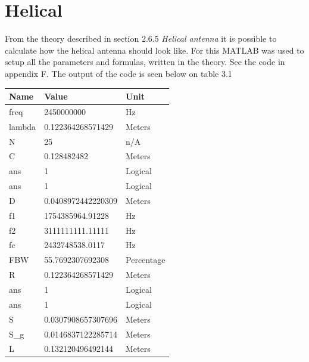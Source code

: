 \newpage

\section{Helical}
From the theory described in section 2.6.5 \textit{Helical antenna} it is possible to calculate how the helical antenna should look like. For this MATLAB\cite{MatLab} was used to setup all the parameters and formulas, written in the theory. See the code in appendix F. The output of the code is seen below on table 3.1

\begin{table}[h!]
\centering
\begin{tabular}{|l|l|l|}
\hline
Name      & Value              & Unit                   \\ \hline
freq      & 2450000000         & Hz                     \\ \hline
lambda    & 0.122364268571429  & Meters                 \\ \hline
N         & 25                 & n/A                    \\ \hline
C         & 0.128482482        & Meters                 \\ \hline
ans       & 1                  & Logical                \\ \hline
ans       & 1                  & Logical                \\ \hline
D         & 0.0408972442220309 & Meters                 \\ \hline
f1        & 1754385964.91228   & Hz                     \\ \hline
f2        & 3111111111.11111   & Hz                     \\ \hline
fc        & 2432748538.0117    & Hz                     \\ \hline
FBW       & 55.7692307692308   & Percentage             \\ \hline
R         & 0.122364268571429  & Meters                 \\ \hline
ans       & 1                  & Logical                \\ \hline
ans       & 1                  & Logical                \\ \hline
S         & 0.0307908657307696 & Meters                 \\ \hline
S\_g      & 0.0146837122285714 & Meters                 \\ \hline
L         & 0.132120496492144  & Meters                 \\ \hline

\end{tabular}
\end{table}
